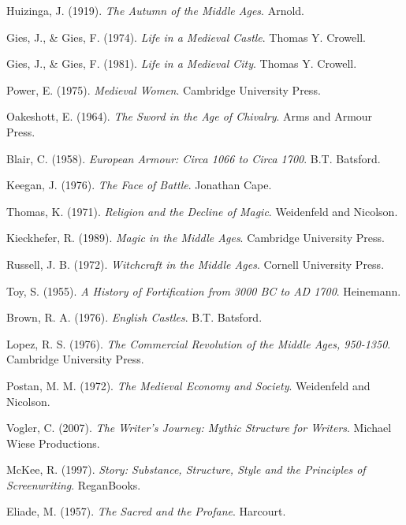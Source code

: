 Huizinga, J. (1919).
\textit{The Autumn of the Middle Ages}.
Arnold.

Gies, J., \& Gies, F. (1974).
\textit{Life in a Medieval Castle}.
Thomas Y. Crowell.

Gies, J., \& Gies, F. (1981).
\textit{Life in a Medieval City}.
Thomas Y. Crowell.

Power, E. (1975).
\textit{Medieval Women}.
Cambridge University Press.

Oakeshott, E. (1964).
\textit{The Sword in the Age of Chivalry}.
Arms and Armour Press.

Blair, C. (1958).
\textit{European Armour: Circa 1066 to Circa 1700}.
B.T. Batsford.

Keegan, J. (1976).
\textit{The Face of Battle}.
Jonathan Cape.

Thomas, K. (1971).
\textit{Religion and the Decline of Magic}.
Weidenfeld and Nicolson.

Kieckhefer, R. (1989).
\textit{Magic in the Middle Ages}.
Cambridge University Press.

Russell, J. B. (1972).
\textit{Witchcraft in the Middle Ages}.
Cornell University Press.

Toy, S. (1955).
\textit{A History of Fortification from 3000 BC to AD 1700}.
Heinemann.

Brown, R. A. (1976).
\textit{English Castles}.
B.T. Batsford.

Lopez, R. S. (1976).
\textit{The Commercial Revolution of the Middle Ages, 950-1350}.
Cambridge University Press.

Postan, M. M. (1972).
\textit{The Medieval Economy and Society}.
Weidenfeld and Nicolson.

Vogler, C. (2007).
\textit{The Writer's Journey: Mythic Structure for Writers}.
Michael Wiese Productions.

McKee, R. (1997).
\textit{Story: Substance, Structure, Style and the Principles of Screenwriting}.
ReganBooks.

Eliade, M. (1957).
\textit{The Sacred and the Profane}.
Harcourt.

